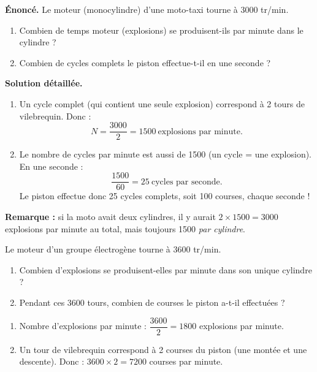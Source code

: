 \documentclass[11pt]{article}
\begin{document}
\begin{exoresolu}
\textbf{Énoncé.} Le moteur (monocylindre) d'une moto-taxi tourne à \num{3000} tr/min.
\begin{enumerate}
\item Combien de temps moteur (explosions) se produisent-ils par minute dans le cylindre ?
\item Combien de cycles complets le piston effectue-t-il en une seconde ?
\end{enumerate}
\tcblower
\textbf{Solution détaillée.}
\begin{enumerate}
\item Un cycle complet (qui contient une seule explosion) correspond à 2 tours de vilebrequin. Donc :
\[ N = \frac{\num{3000}}{2} = \num{1500} \ \text{explosions par minute.} \]
\item Le nombre de cycles par minute est aussi de \num{1500} (un cycle = une explosion). En une seconde :
\[ \frac{\num{1500}}{60} = 25 \ \text{cycles par seconde.} \]
Le piston effectue donc 25 cycles complets, soit 100 courses, chaque seconde !
\end{enumerate}
\textbf{Remarque :} si la moto avait deux cylindres, il y aurait $2 \times \num{1500} = \num{3000}$ explosions par minute au total, mais toujours \num{1500} \emph{par cylindre}.
\end{exoresolu}

\begin{exercice}
Le moteur d'un groupe électrogène tourne à \num{3600} tr/min.
\begin{enumerate}
\item Combien d'explosions se produisent-elles par minute dans son unique cylindre ?
\item Pendant ces \num{3600} tours, combien de courses le piston a-t-il effectuées ?
\end{enumerate}
\end{exercice}

\begin{corrige}
\begin{enumerate}
\item Nombre d'explosions par minute : $\dfrac{\num{3600}}{2} = \num{1800}$ explosions par minute.
\item Un tour de vilebrequin correspond à 2 courses du piston (une montée et une descente). Donc : $\num{3600} \times 2 = \num{7200}$ courses par minute.
\end{enumerate}
\end{corrige}
\end{document}
